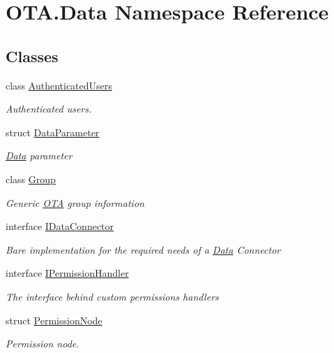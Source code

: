 \hypertarget{namespaceOTA_1_1Data}{}\section{O\+T\+A.\+Data Namespace Reference}
\label{namespaceOTA_1_1Data}
\subsection*{Classes}
\begin{DoxyCompactItemize}
\item 
class \hyperlink{classOTA_1_1Data_1_1AuthenticatedUsers}{Authenticated\+Users}
\begin{DoxyCompactList}\small\item\em Authenticated users. \end{DoxyCompactList}\item 
struct \hyperlink{structOTA_1_1Data_1_1DataParameter}{Data\+Parameter}
\begin{DoxyCompactList}\small\item\em \hyperlink{namespaceOTA_1_1Data}{Data} parameter \end{DoxyCompactList}\item 
class \hyperlink{classOTA_1_1Data_1_1Group}{Group}
\begin{DoxyCompactList}\small\item\em Generic \hyperlink{namespaceOTA}{O\+T\+A} group information \end{DoxyCompactList}\item 
interface \hyperlink{interfaceOTA_1_1Data_1_1IDataConnector}{I\+Data\+Connector}
\begin{DoxyCompactList}\small\item\em Bare implementation for the required needs of a \hyperlink{namespaceOTA_1_1Data}{Data} Connector \end{DoxyCompactList}\item 
interface \hyperlink{interfaceOTA_1_1Data_1_1IPermissionHandler}{I\+Permission\+Handler}
\begin{DoxyCompactList}\small\item\em The interface behind custom permissions handlers \end{DoxyCompactList}\item 
struct \hyperlink{structOTA_1_1Data_1_1PermissionNode}{Permission\+Node}
\begin{DoxyCompactList}\small\item\em Permission node. \end{DoxyCompactList}\item 

\end{DoxyCompactItemize}
